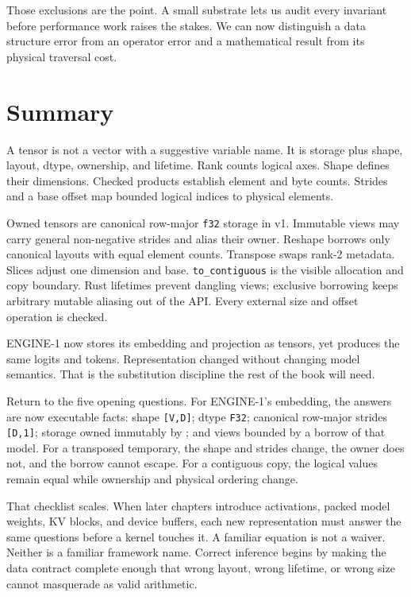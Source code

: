 Those exclusions are the point. A small substrate lets us audit every
invariant before performance work raises the stakes. We can now
distinguish a data structure error from an operator error and a
mathematical result from its physical traversal cost.

\section{Summary}\label{summary-4}

A tensor is not a vector with a suggestive variable name. It is storage
plus shape, layout, dtype, ownership, and lifetime. Rank counts logical
axes. Shape defines their dimensions. Checked products establish element
and byte counts. Strides and a base offset map bounded logical indices
to physical elements.

Owned tensors are canonical row-major \texttt{f32} storage in v1.
Immutable views may carry general non-negative strides and alias their
owner. Reshape borrows only canonical layouts with equal element counts.
Transpose swaps rank-2 metadata. Slices adjust one dimension and base.
\texttt{to\_contiguous} is the visible allocation and copy boundary.
Rust lifetimes prevent dangling views; exclusive borrowing keeps
arbitrary mutable aliasing out of the API. Every external size and
offset operation is checked.

ENGINE-1 now stores its embedding and projection as tensors, yet
produces the same logits and tokens. Representation changed without
changing model semantics. That is the substitution discipline the rest
of the book will need.

Return to the five opening questions. For ENGINE-1's embedding, the
answers are now executable facts: shape \texttt{{[}V,D{]}}; dtype
\texttt{F32}; canonical row-major strides \texttt{{[}D,1{]}}; storage
owned immutably by \texttt{}; and views
bounded by a borrow of that model. For a transposed temporary, the shape
and strides change, the owner does not, and the borrow cannot escape.
For a contiguous copy, the logical values remain equal while ownership
and physical ordering change.

That checklist scales. When later chapters introduce activations, packed
model weights, KV blocks, and device buffers, each new representation
must answer the same questions before a kernel touches it. A familiar
equation is not a waiver. Neither is a familiar framework name. Correct
inference begins by making the data contract complete enough that wrong
layout, wrong lifetime, or wrong size cannot masquerade as valid
arithmetic.

